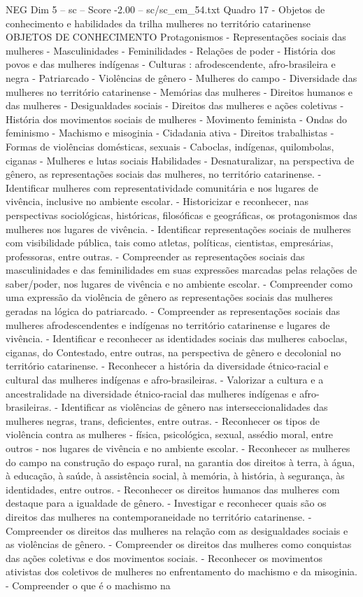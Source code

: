 \begin{textsample}{NEG Dim 5 – sc – Score -2.00 – sc/sc\_em\_54.txt}
Quadro 17 - Objetos de conhecimento e habilidades da trilha mulheres no território catarinense OBJETOS DE CONHECIMENTO Protagonismos - Representações sociais das mulheres - Masculinidades - Feminilidades - Relações de poder - História dos povos e das mulheres indígenas - Culturas : afrodescendente, afro-brasileira e negra - Patriarcado - Violências de gênero - Mulheres do campo - Diversidade das mulheres no território catarinense - Memórias das mulheres - Direitos humanos e das mulheres - Desigualdades sociais - Direitos das mulheres e ações coletivas - História dos movimentos sociais de mulheres - Movimento feminista - Ondas do feminismo - Machismo e misoginia - Cidadania ativa - Direitos trabalhistas - Formas de violências domésticas, sexuais - Caboclas, indígenas, quilombolas, ciganas - Mulheres e lutas sociais Habilidades - Desnaturalizar, na perspectiva de gênero, as representações sociais das mulheres, no território catarinense. - Identificar mulheres com representatividade comunitária e nos lugares de vivência, inclusive no ambiente escolar. - Historicizar e reconhecer, nas perspectivas sociológicas, históricas, filosóficas e geográficas, os protagonismos das mulheres nos lugares de vivência. - Identificar representações sociais de mulheres com visibilidade pública, tais como atletas, políticas, cientistas, empresárias, professoras, entre outras. - Compreender as representações sociais das masculinidades e das feminilidades em suas expressões marcadas pelas relações de saber/poder, nos lugares de vivência e no ambiente escolar. - Compreender como uma expressão da violência de gênero as representações sociais das mulheres geradas na lógica do patriarcado. - Compreender as representações sociais das mulheres afrodescendentes e indígenas no território catarinense e lugares de vivência. - Identificar e reconhecer as identidades sociais das mulheres caboclas, ciganas, do Contestado, entre outras, na perspectiva de gênero e decolonial no território catarinense. - Reconhecer a história da diversidade étnico-racial e cultural das mulheres indígenas e afro-brasileiras. - Valorizar a cultura e a ancestralidade na diversidade étnico-racial das mulheres indígenas e afro-brasileiras. - Identificar as violências de gênero nas interseccionalidades das mulheres negras, trans, deficientes, entre outras. - Reconhecer os tipos de violência contra as mulheres - física, psicológica, sexual, assédio moral, entre outros - nos lugares de vivência e no ambiente escolar. - Reconhecer as mulheres do campo na construção do espaço rural, na garantia dos direitos à terra, à água, à educação, à saúde, à assistência social, à memória, à história, à segurança, às identidades, entre outros. - Reconhecer os direitos humanos das mulheres com destaque para a igualdade de gênero. - Investigar e reconhecer quais são os direitos das mulheres na contemporaneidade no território catarinense. - Compreender os direitos das mulheres na relação com as desigualdades sociais e as violências de gênero. - Compreender os direitos das mulheres como conquistas das ações coletivas e dos movimentos sociais. - Reconhecer os movimentos ativistas dos coletivos de mulheres no enfrentamento do machismo e da misoginia. - Compreender o que é o machismo na 
\end{textsample}

